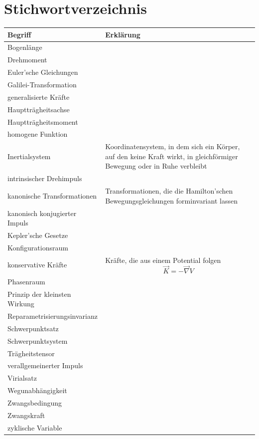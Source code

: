 \documentclass{article}
\begin{document}
\newpage


\section{Stichwortverzeichnis}
\begin{xltabular}{\linewidth}{p{6cm}|X}
	\hline\hline
		Begriff & Erklärung \\
	\hline
		Bogenlänge &  \\
	\hline
		Drehmoment &  \\
	\hline
		Euler'sche Gleichungen &  \\
	\hline
		Galilei-Transformation &  \\
	\hline
		generalisierte Kräfte &  \\
	\hline
		Hauptträgheitsachse &  \\
	\hline
		Hauptträgheitsmoment &  \\
	\hline
		homogene Funktion &  \\
	\hline
		Inertialsystem & Koordinatensystem, in dem sich ein Körper, auf den keine Kraft wirkt, in gleichförmiger Bewegung oder in Ruhe verbleibt \\
	\hline
		intrinsischer Drehimpuls &  \\
	\hline
		kanonische Transformationen &  Transformationen, die die Hamilton'schen Bewegungsgleichungen forminvariant lassen \\
	\hline
		kanonisch konjugierter Impuls &  \\
	\hline
		Kepler'sche Gesetze &  \\
	\hline
		Konfigurationsraum &  \\
	\hline
		konservative Kräfte & Kräfte, die aus einem Potential folgen
			$$\vec{K} = -\vec{\nabla}V$$ \\
	\hline
		Phasenraum &  \\
	\hline
		Prinzip der kleinsten Wirkung &  \\
	\hline
		Reparametrisierungsinvarianz &  \\
	\hline
		Schwerpunktsatz &  \\
	\hline
		Schwerpunktsystem &  \\
	\hline
		Trägheitstensor &  \\
	\hline
		verallgemeinerter Impuls &  \\
	\hline
		Virialsatz &  \\
	\hline
		Wegunabhängigkeit &  \\
	\hline
		Zwangsbedingung &  \\
	\hline
		Zwangskraft &  \\
	\hline
		zyklische Variable &  \\
	\hline\hline
\end{xltabular}
\end{document}

